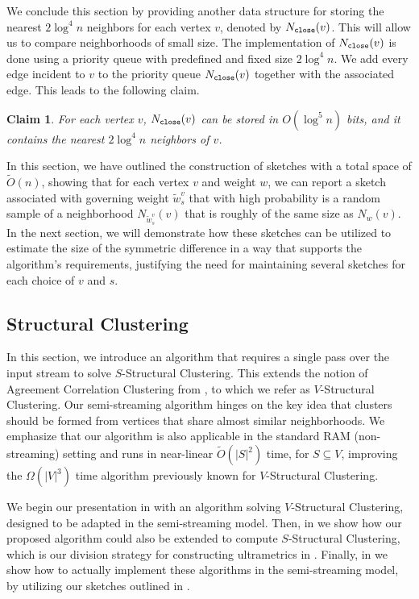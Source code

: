 \documentclass{article}
\newtheorem{claim}[theorem]{Claim}
\begin{document}
We conclude this section by providing another data structure for storing the nearest \(2\log^4 n\) neighbors for each vertex $v$, denoted by \(N_{\texttt{close}}(v)\). This will allow us to compare neighborhoods of small size.
The implementation of \(N_{\texttt{close}}(v)\) is done using a priority queue with predefined and fixed size \(2\log^4 n\). We add every edge incident to $v$ to the priority queue \(N_{\texttt{close}}(v)\) together with the associated edge. This leads to the following claim.

\begin{claim}
\label{clm:sketch3}
 For each vertex \(v\), \(N_{\texttt{close}}(v)\) can be stored in \(O(\log^5 n)\) bits, and it contains the nearest \(2\log^4 n\) neighbors of \(v\).
\end{claim}

In this section, we have outlined the construction of sketches with a total space of $\tilde{O}(n)$, showing that for each vertex $v$ and weight $w$, we can report a sketch associated with  governing weight \(\tilde{w}^v_s \) that with high probability is a random sample of a neighborhood $N_{\tilde{w}^v_s}(v)$ that is roughly of the same size as $N_w(v)$. 
In the next section, we will demonstrate how these sketches can be utilized to estimate the size of the symmetric difference in a way that supports the algorithm’s requirements, justifying the need for maintaining several sketches for each choice of $v$ and $s$. 


\subsection{Structural Clustering} \label{section:structuralClustering}
\newcommand{\agreez}[1]{A^3(#1)}

In this section, we introduce an algorithm that requires a single pass over the input stream to solve $S$-Structural Clustering. This extends the notion of Agreement Correlation Clustering from \cite{cohen2022fitting}, to which we refer as $V$-Structural Clustering. Our semi-streaming algorithm hinges on the key idea that clusters should be formed from vertices that share almost similar neighborhoods.
We emphasize that our algorithm is also applicable in the standard RAM (non-streaming) setting and runs in near-linear $\widetilde{O}(|S|^2)$ time, for $S\subseteq V$, improving the $\Omega(|V|^3)$ time algorithm previously known for $V$-Structural Clustering.

We begin our presentation in  with an algorithm solving $V$-Structural Clustering, designed to be adapted in the semi-streaming model.
Then, in  we show how our proposed algorithm could also be extended to compute $S$-Structural Clustering, which is our division strategy for constructing ultrametrics in .
Finally, in  we show how to actually implement these algorithms in the semi-streaming model, by utilizing our sketches outlined in .
\end{document}
